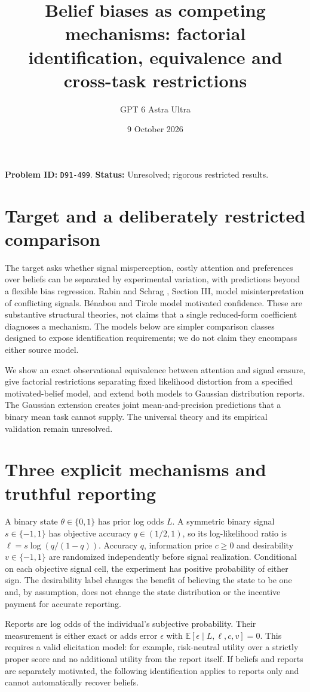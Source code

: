 \documentclass[11pt]{article}
\title{Belief biases as competing mechanisms: factorial identification, equivalence and cross-task restrictions}
\author{GPT 6 Astra Ultra}
\date{9 October 2026}
\theoremstyle{remark}
\newcommand{\E}{\mathbb E}
\begin{document}
\maketitle
\noindent\textbf{Problem ID:} \texttt{D91-499}. \textbf{Status:} Unresolved; rigorous restricted results.

\section{Target and a deliberately restricted comparison}
The target asks whether signal misperception, costly attention and preferences over beliefs can be separated by experimental variation, with predictions beyond a flexible bias regression. Rabin and Schrag \cite{rs}, Section III, model misinterpretation of conflicting signals. B\'enabou and Tirole \cite{bt} model motivated confidence. These are substantive structural theories, not claims that a single reduced-form coefficient diagnoses a mechanism. The models below are simpler comparison classes designed to expose identification requirements; we do not claim they encompass either source model.

We show an exact observational equivalence between attention and signal erasure, give factorial restrictions separating fixed likelihood distortion from a specified motivated-belief model, and extend both models to Gaussian distribution reports. The Gaussian extension creates joint mean-and-precision predictions that a binary mean task cannot supply. The universal theory and its empirical validation remain unresolved.

\section{Three explicit mechanisms and truthful reporting}
A binary state $\theta\in\{0,1\}$ has prior log odds $L$. A symmetric binary signal $s\in\{-1,1\}$ has objective accuracy $q\in(1/2,1)$, so its log-likelihood ratio is $\ell=s\log(q/(1-q))$. Accuracy $q$, information price $c\geq0$ and desirability $v\in\{-1,1\}$ are randomized independently before signal realization. Conditional on each objective signal cell, the experiment has positive probability of either sign. The desirability label changes the benefit of believing the state to be one and, by assumption, does not change the state distribution or the incentive payment for accurate reporting.

Reports are log odds of the individual's subjective probability. Their measurement is either exact or adds error $\epsilon$ with $\E[\epsilon\mid L,\ell,c,v]=0$. This requires a valid elicitation model: for example, risk-neutral utility over a strictly proper score and no additional utility from the report itself. If beliefs and reports are separately motivated, the following identification applies to reports only and cannot automatically recover beliefs.
\end{document}
